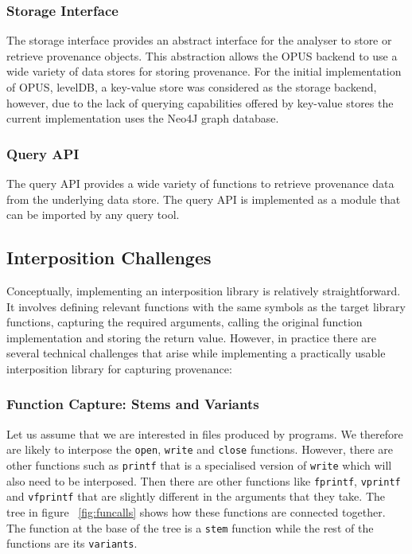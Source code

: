 \documentclass[withindex,glossary]{cam-thesis}
\begin{document}
\subsubsection{Storage Interface}
The storage interface provides an abstract interface for the analyser to store or retrieve provenance objects.
This abstraction allows the OPUS backend to use a wide variety of data stores for storing provenance.
For the initial implementation of OPUS, levelDB, a key-value store was considered as the storage backend, however, due to the lack of querying capabilities offered by key-value stores the current implementation uses the Neo4J graph database.

\subsubsection{Query API}
The query API provides a wide variety of functions to retrieve provenance data from the underlying data store.
The query API is implemented as a module that can be imported by any query tool.

\subsection{Interposition Challenges} 

Conceptually, implementing an interposition library is relatively straightforward.
It involves defining relevant functions with the same symbols as the target library functions, capturing the required arguments, calling the original function implementation and storing the return value.
However, in practice there are several technical challenges that arise while implementing a practically usable interposition library for capturing provenance:

\subsubsection{Function Capture: Stems and Variants}
Let us assume that we are interested in files produced by programs.
We therefore are likely to interpose the \texttt{open}, \texttt{write} and \texttt{close} functions.
However, there are other functions such as \texttt{printf} that is a specialised version of \texttt{write} which will also need to be interposed.
Then there are other functions like \texttt{fprintf}, \texttt{vprintf} and \texttt{vfprintf} that are slightly different in the arguments that they take.
The tree in figure ~\ref{fig:funcalls} shows how these functions are connected together.
The function at the base of the tree is a \texttt{stem} function while the rest of the functions are its \texttt{variants}.
\end{document}
